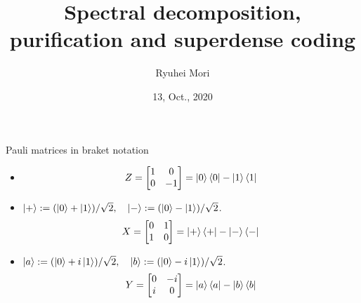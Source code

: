 \documentclass[10pt]{beamer}
\title{Spectral decomposition, purification and superdense coding}
\author{Ryuhei Mori}
\institute{Tokyo Institute of Technology}
\date{13, Oct., 2020}
\begin{document}
\begin{frame}[plain]
\maketitle
\end{frame}

\begin{frame}{Pauli matrices in braket notation}
\begin{itemize}
\setlength{\itemsep}{3em}
\item
\begin{equation*}
Z=\begin{bmatrix}1&0\\0&-1\end{bmatrix}=
\ket{0}\bra{0}
-\ket{1}\bra{1}
\end{equation*}
\item
$\ket{+}:=(\ket{0}+\ket{1})/\sqrt{2},\quad  \ket{-}:=(\ket{0}-\ket{1})/\sqrt{2}$.
\begin{equation*}
X=\begin{bmatrix}0&1\\1&0\end{bmatrix}=
\ket{+}\bra{+}
-\ket{-}\bra{-}
\end{equation*}
\item
$\ket{a}:=(\ket{0}+i\ket{1})/\sqrt{2},\quad  \ket{b}:=(\ket{0}-i\ket{1})/\sqrt{2}$.
\begin{equation*}
Y=\begin{bmatrix}0&-i\\i&0\end{bmatrix}=
\ket{a}\bra{a}
-\ket{b}\bra{b}
\end{equation*}
\end{itemize}
\end{frame}
\end{document}
